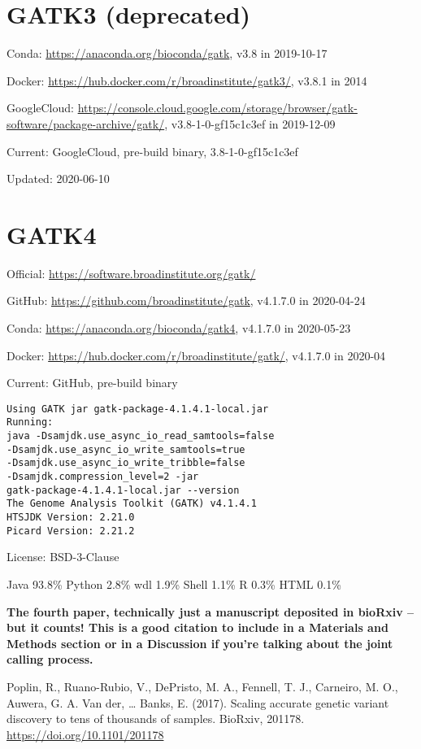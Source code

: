 \documentclass[]{article}
\begin{document}
\section{GATK3 (deprecated)}

Conda: \url{https://anaconda.org/bioconda/gatk}, v3.8 in 2019-10-17

Docker: \url{https://hub.docker.com/r/broadinstitute/gatk3/}, v3.8.1 in 2014

GoogleCloud: \url{https://console.cloud.google.com/storage/browser/gatk-software/package-archive/gatk/}, v3.8-1-0-gf15c1c3ef in 2019-12-09

Current: GoogleCloud, pre-build binary, 3.8-1-0-gf15c1c3ef

Updated: 2020-06-10

\section{GATK4}

Official: \url{https://software.broadinstitute.org/gatk/}

GitHub: \url{https://github.com/broadinstitute/gatk}, v4.1.7.0 in 2020-04-24

Conda: \url{https://anaconda.org/bioconda/gatk4}, v4.1.7.0 in 2020-05-23

Docker: \url{https://hub.docker.com/r/broadinstitute/gatk/}, v4.1.7.0 in 2020-04

Current: GitHub, pre-build binary

\begin{verbatim}
Using GATK jar gatk-package-4.1.4.1-local.jar
Running:
java -Dsamjdk.use_async_io_read_samtools=false
-Dsamjdk.use_async_io_write_samtools=true
-Dsamjdk.use_async_io_write_tribble=false
-Dsamjdk.compression_level=2 -jar 
gatk-package-4.1.4.1-local.jar --version
The Genome Analysis Toolkit (GATK) v4.1.4.1
HTSJDK Version: 2.21.0
Picard Version: 2.21.2
\end{verbatim}

License: BSD-3-Clause

Java 93.8\% Python 2.8\% wdl 1.9\% Shell 1.1\% R 0.3\% HTML 0.1\%

\textbf{The fourth paper, technically just a manuscript deposited in bioRxiv -- but it counts! This is a good citation to include in a Materials and Methods section or in a Discussion if you're talking about the joint calling process.}

Poplin, R., Ruano-Rubio, V., DePristo, M. A., Fennell, T. J., Carneiro, M. O., Auwera, G. A. Van der, … Banks, E. (2017). Scaling accurate genetic variant discovery to tens of thousands of samples. BioRxiv, 201178. \url{https://doi.org/10.1101/201178}
\end{document}
